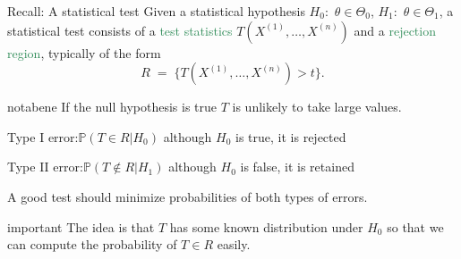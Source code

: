 \documentclass[dvipsnames,aspectratio=169]{beamer} %
\renewcommand{\P}{\mathbb{P}}
\begin{document}
\begin{frame}{Recall: A statistical test}
	Given a statistical hypothesis $H_0:$ $\theta\in \Theta_0$, $H_1:$ $\theta\in \Theta_1$, a statistical test consists of a \textcolor{SeaGreen}{test statistics} $T(X^{(1)},\ldots,X^{(n)})$ and a \textcolor{SeaGreen}{rejection region}, typically of the form
	$$
	R\;=\;\{T(X^{(1)},\ldots,X^{(n)})>t\}.
	$$ 
\begin{beamercolorbox}[wd=\paperwidth,sep=2pt]{notabene}	
If the null hypothesis is true $T$ is unlikely to take large values. \end{beamercolorbox}
\begin{alertblock}{Type I error:\quad $\P(T\in R|H_0)$} 
	although $H_0$ is true, it is rejected 
\end{alertblock}
\begin{alertblock}{Type II error:\quad $\P(T\notin R|H_1)$} 
	although $H_0$ is false, it is retained\end{alertblock}
\bigskip
A good test should minimize probabilities of both types of errors.\\[.2cm]
\begin{beamercolorbox}[wd=\paperwidth,sep=2pt]{important}	
The idea is that $T$ has some known distribution under $H_0$ so that we can compute the probability of $T\in R$ easily. \end{beamercolorbox}
\end{frame}

\end{document}

